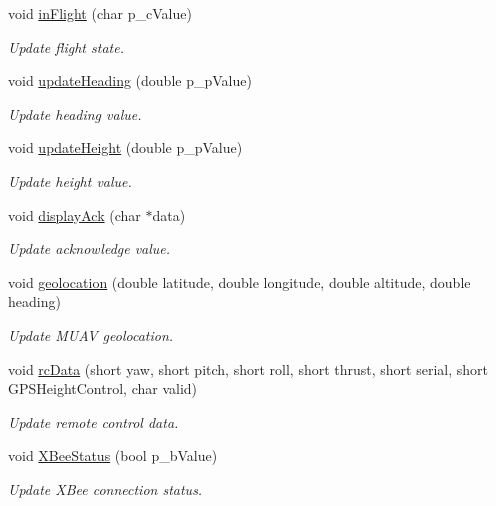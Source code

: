 \begin{DoxyCompactItemize}
void \hyperlink{class_communication_control_a130ffeff0d926e1250a2b4da5a7bd8fc}{in\-Flight} (char p\-\_\-c\-Value)
\begin{DoxyCompactList}\small\item\em Update flight state. \end{DoxyCompactList}\item 
void \hyperlink{class_communication_control_a7d217c6e3227147db5850e8440c95a91}{update\-Heading} (double p\-\_\-p\-Value)
\begin{DoxyCompactList}\small\item\em Update heading value. \end{DoxyCompactList}\item 
void \hyperlink{class_communication_control_a119483d53d4e17a60c93d329734718b3}{update\-Height} (double p\-\_\-p\-Value)
\begin{DoxyCompactList}\small\item\em Update height value. \end{DoxyCompactList}\item 
void \hyperlink{class_communication_control_af76e91ad82632e3698e2dea887cac7be}{display\-Ack} (char $\ast$data)
\begin{DoxyCompactList}\small\item\em Update acknowledge value. \end{DoxyCompactList}\item 
void \hyperlink{class_communication_control_a16ab12eeb75b3504d8a3d520f18206d2}{geolocation} (double latitude, double longitude, double altitude, double heading)
\begin{DoxyCompactList}\small\item\em Update M\-U\-A\-V geolocation. \end{DoxyCompactList}\item 
void \hyperlink{class_communication_control_a6e7005e168c6085e8aeb80e859332b8d}{rc\-Data} (short yaw, short pitch, short roll, short thrust, short serial, short G\-P\-S\-Height\-Control, char valid)
\begin{DoxyCompactList}\small\item\em Update remote control data. \end{DoxyCompactList}\item 
void \hyperlink{class_communication_control_ab70e1fc176378dd2ffabea7f4f2a1762}{X\-Bee\-Status} (bool p\-\_\-b\-Value)
\begin{DoxyCompactList}\small\item\em Update X\-Bee connection status. \end{DoxyCompactList}\item 

\end{DoxyCompactItemize}
